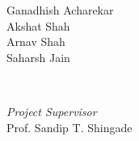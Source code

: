 \documentclass[]{book}
\begin{document}
\begin{titlepage}
	
	\begin{minipage}{0.4\textwidth}
		\begin{flushleft}
			\large
			Ganadhish Acharekar\\
			Akshat Shah\\
			Arnav Shah\\
			Saharsh Jain
		\end{flushleft}
	\end{minipage}
	~
	\begin{minipage}{0.4\textwidth}
		\begin{flushright}
			\large
			\textit{Project Supervisor}\\
			Prof. Sandip T. Shingade
		\end{flushright}
	\end{minipage}
	
	
	
	
	
	
	 
	
	\vfill %
	
\end{titlepage}





\end{document}
